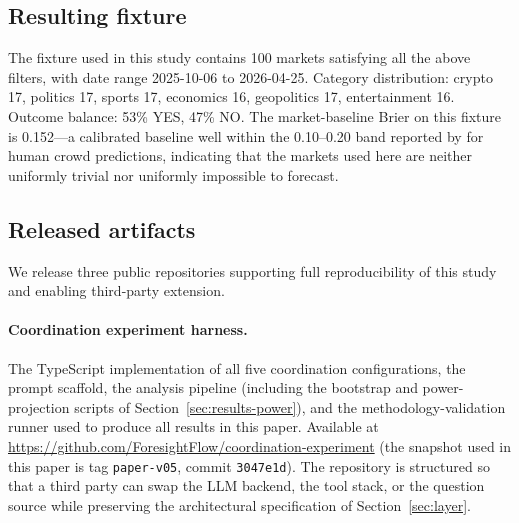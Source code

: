 \documentclass[11pt]{article}
\begin{document}
\subsection{Resulting fixture}
\label{sec:experiment-fixture-stats}

The fixture used in this study contains 100 markets satisfying all the above filters, with date range 2025-10-06 to 2026-04-25. Category distribution: crypto 17, politics 17, sports 17, economics 16, geopolitics 17, entertainment 16. Outcome balance: 53\% YES, 47\% NO. The market-baseline Brier on this fixture is 0.152---a calibrated baseline well within the 0.10--0.20 band reported by \citet{zou2024forecastbench} for human crowd predictions, indicating that the markets used here are neither uniformly trivial nor uniformly impossible to forecast.

\subsection{Released artifacts}
\label{sec:experiment-artifacts}

We release three public repositories supporting full reproducibility of this study and enabling third-party extension.

\paragraph{Coordination experiment harness.} The TypeScript implementation of all five coordination configurations, the prompt scaffold, the analysis pipeline (including the bootstrap and power-projection scripts of Section~\ref{sec:results-power}), and the methodology-validation runner used to produce all results in this paper. Available at \url{https://github.com/ForesightFlow/coordination-experiment} (the snapshot used in this paper is tag \texttt{paper-v05}, commit \texttt{3047e1d}). The repository is structured so that a third party can swap the LLM backend, the tool stack, or the question source while preserving the architectural specification of Section~\ref{sec:layer}.
\end{document}
